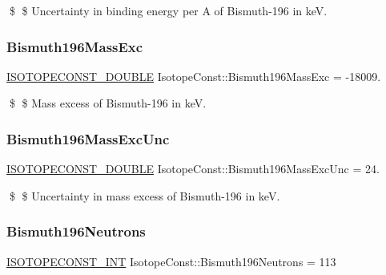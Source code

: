 \$ \$ Uncertainty in binding energy per A of Bismuth-\/196 in keV. \mbox{\label{group___isotope_const-_bismuth-_bi196_ga72bc23081c5111ae2d0d1ef3a8d42874}} 
\subsubsection{\texorpdfstring{Bismuth196\+Mass\+Exc}{Bismuth196MassExc}}
{\footnotesize\ttfamily \mbox{\hyperlink{group___isotope_const-_macros_ga8f45a7272ce02c0b4c65c44636ed719a}{I\+S\+O\+T\+O\+P\+E\+C\+O\+N\+S\+T\+\_\+\+D\+O\+U\+B\+LE}} Isotope\+Const\+::\+Bismuth196\+Mass\+Exc = -\/18009.}

\$ \$ Mass excess of Bismuth-\/196 in keV. \mbox{\label{group___isotope_const-_bismuth-_bi196_ga23ce9dd66429237b53f99437f1917465}} 
\subsubsection{\texorpdfstring{Bismuth196\+Mass\+Exc\+Unc}{Bismuth196MassExcUnc}}
{\footnotesize\ttfamily \mbox{\hyperlink{group___isotope_const-_macros_ga8f45a7272ce02c0b4c65c44636ed719a}{I\+S\+O\+T\+O\+P\+E\+C\+O\+N\+S\+T\+\_\+\+D\+O\+U\+B\+LE}} Isotope\+Const\+::\+Bismuth196\+Mass\+Exc\+Unc = 24.}

\$ \$ Uncertainty in mass excess of Bismuth-\/196 in keV. \mbox{\label{group___isotope_const-_bismuth-_bi196_ga59682d100f06f5aa3e80fa5c7b7aee77}} 
\subsubsection{\texorpdfstring{Bismuth196\+Neutrons}{Bismuth196Neutrons}}
{\footnotesize\ttfamily \mbox{\hyperlink{group___isotope_const-_macros_ga5f18360b3e99483a35c32d789e62621c}{I\+S\+O\+T\+O\+P\+E\+C\+O\+N\+S\+T\+\_\+\+I\+NT}} Isotope\+Const\+::\+Bismuth196\+Neutrons = 113}

